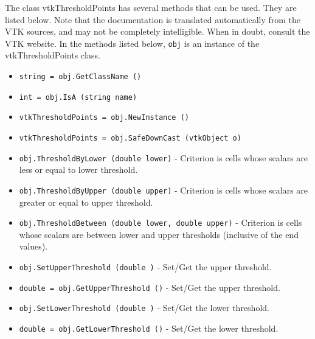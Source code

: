 The class vtkThresholdPoints has several methods that can be used.
  They are listed below.
Note that the documentation is translated automatically from the VTK sources,
and may not be completely intelligible.  When in doubt, consult the VTK website.
In the methods listed below, \verb|obj| is an instance of the vtkThresholdPoints class.
\begin{itemize}
\item  \verb|string = obj.GetClassName ()|

\item  \verb|int = obj.IsA (string name)|

\item  \verb|vtkThresholdPoints = obj.NewInstance ()|

\item  \verb|vtkThresholdPoints = obj.SafeDownCast (vtkObject o)|

\item  \verb|obj.ThresholdByLower (double lower)| -  Criterion is cells whose scalars are less or equal to lower threshold.

\item  \verb|obj.ThresholdByUpper (double upper)| -  Criterion is cells whose scalars are greater or equal to upper threshold.

\item  \verb|obj.ThresholdBetween (double lower, double upper)| -  Criterion is cells whose scalars are between lower and upper thresholds
 (inclusive of the end values).

\item  \verb|obj.SetUpperThreshold (double )| -  Set/Get the upper threshold.

\item  \verb|double = obj.GetUpperThreshold ()| -  Set/Get the upper threshold.

\item  \verb|obj.SetLowerThreshold (double )| -  Set/Get the lower threshold.

\item  \verb|double = obj.GetLowerThreshold ()| -  Set/Get the lower threshold.

\end{itemize}
